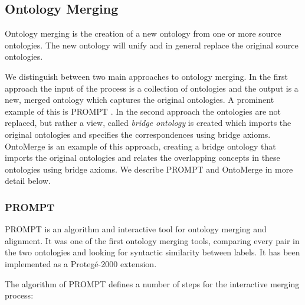 \subsection{Ontology Merging}
\label{subsec:mediationapproaches_ontologymerging}
Ontology merging is the creation of a new ontology from one or more
source ontologies. The new ontology will unify and in general replace
the original source ontologies. 

We distinguish between two main approaches to ontology merging. In the
first approach the input of the process is a collection of ontologies
and the output is a new, merged ontology which captures the original
ontologies. A prominent example of this is PROMPT \cite{noy2000prompt}. 
In the second approach the ontologies are not replaced, but
rather a {\textquotesingle}view{\textquotesingle}, called
\textit{bridge ontology} is created which imports the original
ontologies and specifies the correspondences using bridge axioms.
OntoMerge \cite{dou2002ontology_translation} is an example of this approach, creating a
bridge ontology that imports the original ontologies and relates the
overlapping concepts in these ontologies using bridge axioms. We
describe PROMPT and OntoMerge in more detail below. 

\subsubsection{PROMPT}
\label{subsubsec:mediationapproaches_ontologymerging_PROMPT}
PROMPT \cite{noy2000prompt} is an algorithm and interactive tool for
ontology merging and alignment. It was one of the first ontology
merging tools, comparing every pair in the two ontologies and looking
for syntactic similarity between labels. It has been implemented as a
Proteg\'e-2000 extension. 

The algorithm of PROMPT defines a number of steps for the interactive
merging process: 

